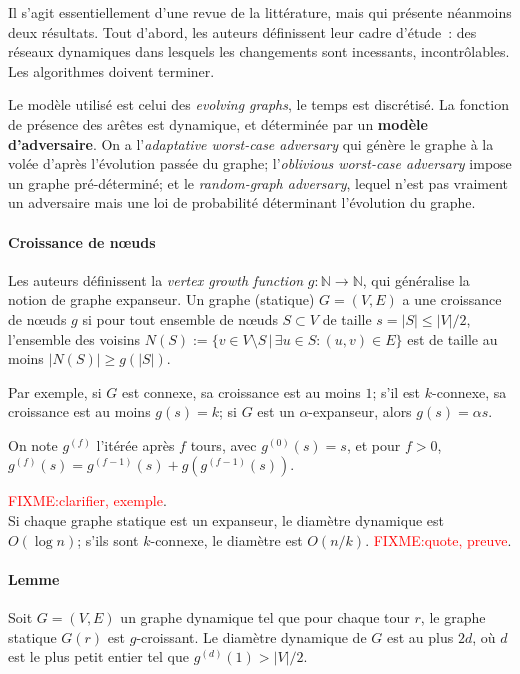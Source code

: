 \documentclass[12pt,a4paper]{article}
\begin{document}
Il s'agit essentiellement d'une revue de la littérature, mais qui
présente néanmoins deux résultats. Tout d'abord, les auteurs
définissent leur cadre d'étude~: des réseaux dynamiques dans lesquels
les changements sont incessants, incontrôlables. Les algorithmes
doivent terminer.

Le modèle utilisé est celui des \textit{evolving graphs}, le temps est
discrétisé. La fonction de présence des arêtes est dynamique, et
déterminée par un \textbf{modèle d'adversaire}. On a
l'\textit{adaptative worst-case adversary} qui génère le graphe à la
volée d'après l'évolution passée du graphe; l'\textit{oblivious
  worst-case adversary} impose un graphe pré-déterminé; et le
\textit{random-graph adversary}, lequel n'est pas vraiment un
adversaire mais une loi de probabilité déterminant l'évolution du
graphe.

\paragraph{Croissance de nœuds} Les auteurs définissent la
\textit{vertex growth function} \(g : \mathbb{N} \to \mathbb{N}\), qui
généralise la notion de graphe expanseur. Un graphe (statique)
\(G = (V, E)\) a une croissance de nœuds \(g\) si pour tout ensemble
de nœuds \(S \subset V\) de taille \(s = |S| \leq |V|/2\), l'ensemble
des voisins
\(N(S) := \{v \in V \setminus S \,|\, \exists u \in S : (u, v) \in
E\}\) est de taille au moins \(|N(S)| \geq g(|S|)\).

Par exemple, si \(G\) est connexe, sa croissance est au moins \(1\);
s'il est \(k\)-connexe, sa croissance est au moins \(g(s) = k\); si
\(G\) est un \(\alpha\)-expanseur, alors \(g(s) = \alpha s\).

On note \(g^{(f)}\) l'itérée après \(f\) tours, avec
\(g^{(0)}(s) = s\), et pour \(f > 0\),
\(g^{(f)}(s) = g^{(f-1)}(s) + g(g^{(f-1)}(s))\).

\textcolor{red}{FIXME:\@ clarifier, exemple}.\\

Si chaque graphe statique est un expanseur, le diamètre dynamique est
\(O(\log n)\); s'ils sont \(k\)-connexe, le diamètre est \(O(n/k)\).
\textcolor{red}{FIXME:\@ quote, preuve}.

\paragraph{Lemme} Soit \(G = (V, E)\) un graphe dynamique tel que pour
chaque tour \(r\), le graphe statique \(G(r)\) est \(g\)-croissant. Le
diamètre dynamique de \(G\) est au plus \(2d\), où \(d\) est le plus
petit entier tel que \(g^{(d)}(1) > |V|/2\).\\
\end{document}
